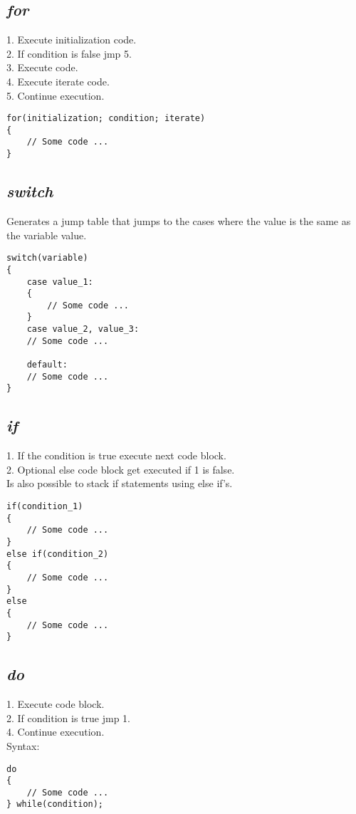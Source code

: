 \documentclass[10pt,a4paper]{article}
\begin{document}
\subsection{\textit{for}}
1. Execute initialization code. \\
2. If condition is false jmp 5. \\
3. Execute code. \\
4. Execute iterate code. \\
5. Continue execution. \\
\begin{lstlisting}
for(initialization; condition; iterate)
{
	// Some code ...
}
\end{lstlisting}


\subsection{\textit{switch}}
Generates a jump table that jumps to the cases where the value is the same as the variable value.
\begin{lstlisting}
switch(variable)
{
	case value_1:
	{
		// Some code ...
	}
	case value_2, value_3:
	// Some code ...

	default:
	// Some code ...
}
\end{lstlisting}


\subsection{\textit{if}}
1. If the condition is true execute next code block. \\
2. Optional else code block get executed if 1 is false. \\
Is also possible to stack if statements using else if's.
\begin{lstlisting}
if(condition_1)
{
	// Some code ...
}
else if(condition_2)
{
	// Some code ...
}
else
{
	// Some code ...
}
\end{lstlisting}


\subsection{\textit{do}}
1. Execute code block. \\
2. If condition is true jmp 1. \\
4. Continue execution. \\
Syntax:
\begin{lstlisting}
do
{
	// Some code ...
} while(condition);
\end{lstlisting}
\end{document}
